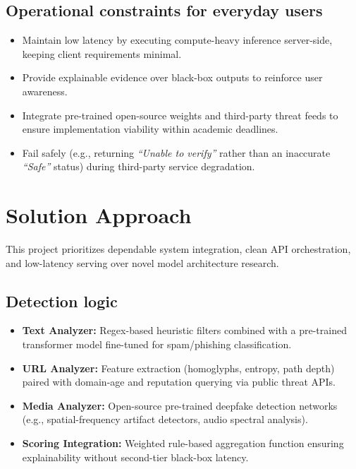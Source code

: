 \documentclass[11pt,a4paper]{article}
\newcommand{\BvrHint}[1]{%
  {\normalfont\normalsize\itshape\hfill #1}}
\begin{document}
\subsection{Operational constraints for everyday users}
\begin{itemize}[leftmargin=0.7cm]
    \item Maintain low latency by executing compute-heavy inference server-side, keeping client requirements minimal.
    \item Provide explainable evidence over black-box outputs to reinforce user awareness.
    \item Integrate pre-trained open-source weights and third-party threat feeds to ensure implementation viability within academic deadlines.
    \item Fail safely (e.g., returning \emph{``Unable to verify''} rather than an inaccurate \emph{``Safe''} status) during third-party service degradation.
\end{itemize}

\section{Solution Approach %
\BvrHint{}}
This project prioritizes dependable system integration, clean API orchestration, and low-latency serving over novel model architecture research.

\subsection{Detection logic %
\BvrHint{}}
\begin{itemize}[leftmargin=0.7cm]
    \item \textbf{Text Analyzer:} Regex-based heuristic filters combined with a pre-trained transformer model fine-tuned for spam/phishing classification.
    \item \textbf{URL Analyzer:} Feature extraction (homoglyphs, entropy, path depth) paired with domain-age and reputation querying via public threat APIs.
    \item \textbf{Media Analyzer:} Open-source pre-trained deepfake detection networks (e.g., spatial-frequency artifact detectors, audio spectral analysis).
    \item \textbf{Scoring Integration:} Weighted rule-based aggregation function ensuring explainability without second-tier black-box latency.
\end{itemize}
\end{document}
